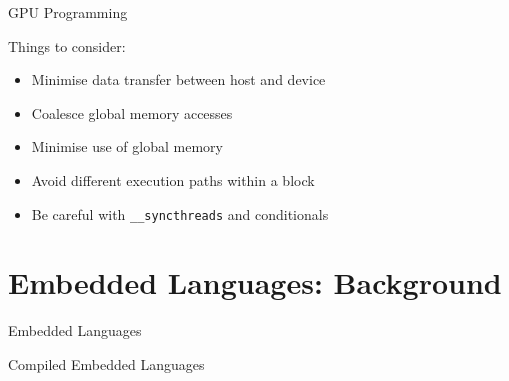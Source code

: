 \documentclass[xcolor=dvipsnames]{beamer}
\begin{document}
\begin{frame}{GPU Programming} 

  Things to consider:

  \begin{itemize} 
    \item Minimise data transfer between host and device
    \item Coalesce global memory accesses
    \item Minimise use of global memory 
    \item Avoid different execution paths within a block
    \item Be careful with {\tt \_\_syncthreads} and conditionals
  \end{itemize} 
  
\end{frame} 


%
\section{Embedded Languages: Background}


\begin{frame}{Embedded Languages} 
 \begin{center}
   {\Large Compiled Embedded Languages}
 \end{center}

\end{frame} 
\end{document}
